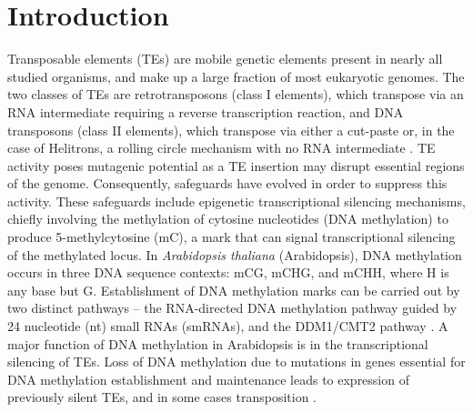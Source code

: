 \documentclass[12pt]{article}
\begin{document}
\section{Introduction}

Transposable elements (TEs) are mobile genetic elements present in
nearly all studied organisms, and make up a large fraction of most
eukaryotic genomes. The two classes of TEs are retrotransposons (class
I elements), which transpose via an RNA intermediate requiring a
reverse transcription reaction, and DNA transposons (class II
elements), which transpose via either a cut-paste or, in the case of
Helitrons, a rolling circle mechanism with no RNA intermediate
\cite{Wicker:2007en}. TE activity poses mutagenic potential as a TE
insertion may disrupt essential regions of the genome. Consequently,
safeguards have evolved in order to suppress this activity. These
safeguards include epigenetic transcriptional silencing mechanisms,
chiefly involving the methylation of cytosine nucleotides (DNA
methylation) to produce 5-methylcytosine (mC), a mark that can signal
transcriptional silencing of the methylated locus. In
\emph{Arabidopsis thaliana }(Arabidopsis), DNA methylation occurs in
three DNA sequence contexts: mCG, mCHG, and mCHH, where H is any base
but G. Establishment of DNA methylation marks can be carried out by
two distinct pathways -- the RNA-directed DNA methylation pathway
guided by 24 nucleotide (nt) small RNAs (smRNAs), and the DDM1/CMT2
pathway \cite{Zemach:2013dj, Matzke:2014ek}. A major function of DNA
methylation in Arabidopsis is in the transcriptional silencing of TEs.
Loss of DNA methylation due to mutations in genes essential for DNA
methylation establishment and maintenance leads to expression of
previously silent TEs, and in some cases transposition
\cite{Mirouze:2009km, Miura:2001eg, Saze:2003du, Lippman:2004cm,
  Jeddeloh:1999gu, Zemach:2013dj}.
\end{document}
